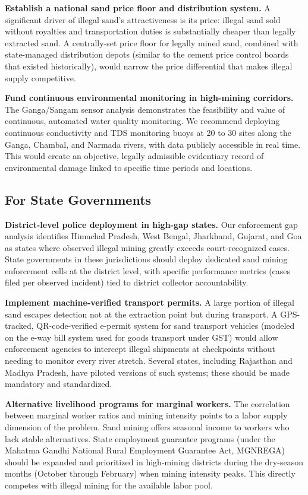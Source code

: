 \documentclass[12pt]{article}
\begin{document}
\textbf{Establish a national sand price floor and distribution system.} A significant driver of illegal sand's attractiveness is its price: illegal sand sold without royalties and transportation duties is substantially cheaper than legally extracted sand. A centrally-set price floor for legally mined sand, combined with state-managed distribution depots (similar to the cement price control boards that existed historically), would narrow the price differential that makes illegal supply competitive.

\textbf{Fund continuous environmental monitoring in high-mining corridors.} The Ganga/Sangam sensor analysis demonstrates the feasibility and value of continuous, automated water quality monitoring. We recommend deploying continuous conductivity and TDS monitoring buoys at 20 to 30 sites along the Ganga, Chambal, and Narmada rivers, with data publicly accessible in real time. This would create an objective, legally admissible evidentiary record of environmental damage linked to specific time periods and locations.

\subsection{For State Governments}

\textbf{District-level police deployment in high-gap states.} Our enforcement gap analysis identifies Himachal Pradesh, West Bengal, Jharkhand, Gujarat, and Goa as states where observed illegal mining greatly exceeds court-recognized cases. State governments in these jurisdictions should deploy dedicated sand mining enforcement cells at the district level, with specific performance metrics (cases filed per observed incident) tied to district collector accountability.

\textbf{Implement machine-verified transport permits.} A large portion of illegal sand escapes detection not at the extraction point but during transport. A GPS-tracked, QR-code-verified e-permit system for sand transport vehicles (modeled on the e-way bill system used for goods transport under GST) would allow enforcement agencies to intercept illegal shipments at checkpoints without needing to monitor every river stretch. Several states, including Rajasthan and Madhya Pradesh, have piloted versions of such systems; these should be made mandatory and standardized.

\textbf{Alternative livelihood programs for marginal workers.} The correlation between marginal worker ratios and mining intensity points to a labor supply dimension of the problem. Sand mining offers seasonal income to workers who lack stable alternatives. State employment guarantee programs (under the Mahatma Gandhi National Rural Employment Guarantee Act, MGNREGA) should be expanded and prioritized in high-mining districts during the dry-season months (October through February) when mining intensity peaks. This directly competes with illegal mining for the available labor pool.
\end{document}
